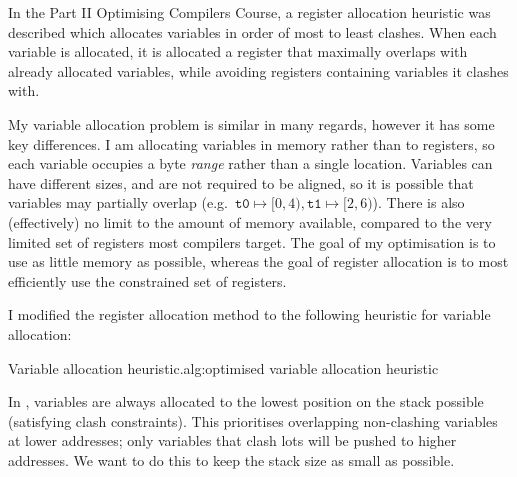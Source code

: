 \documentclass[00-main.tex]{subfiles}
\begin{document}
In the Part II Optimising Compilers Course, a register allocation heuristic was described which allocates variables in order of most to least clashes.
When each variable is allocated, it is allocated a register that maximally overlaps with already allocated variables, while avoiding registers containing variables it clashes with.

My variable allocation problem is similar in many regards, however it has some key differences.
I am allocating variables in memory rather than to registers, so each variable occupies a byte \emph{range} rather than a single location.
Variables can have different sizes, and are not required to be aligned, so it is possible that variables may partially overlap (e.g.~$\texttt{t0} \mapsto [0, 4), \texttt{t1} \mapsto [2, 6)$). %
There is also (effectively) no limit to the amount of memory available, compared to the very limited set of registers most compilers target.
The goal of my optimisation is to use as little memory as possible, whereas the goal of register allocation is to most efficiently use the constrained set of registers.

I modified the register allocation method to the following heuristic for variable allocation:

\begin{Algorithm}{Variable allocation heuristic.}{alg:optimised variable allocation heuristic}
\end{Algorithm}

In , variables are always allocated to the lowest position on the stack possible (satisfying clash constraints).
This prioritises overlapping non-clashing variables at lower addresses; only variables that clash lots will be pushed to higher addresses.
We want to do this to keep the stack size as small as possible.
\end{document}
